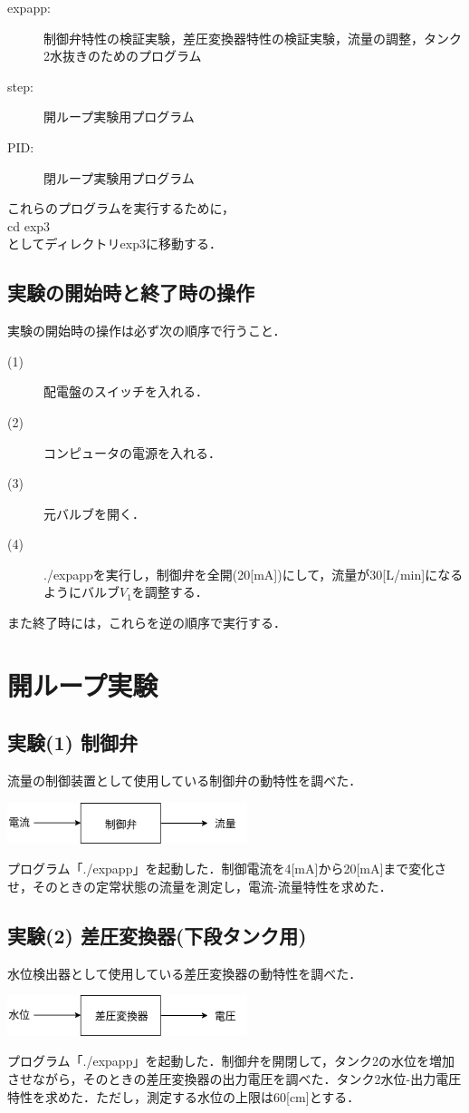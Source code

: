 \documentclass[12pt]{jsarticle}
\begin{document}
\begin{description}
  \item[expapp:]制御弁特性の検証実験，差圧変換器特性の検証実験，流量の調整，タンク2水抜きのためのプログラム
  \item[step:]開ループ実験用プログラム
  \item[PID:]閉ループ実験用プログラム
\end{description}

これらのプログラムを実行するために，\\
cd exp3\\
としてディレクトリexp3に移動する．
\subsection{実験の開始時と終了時の操作}
実験の開始時の操作は必ず次の順序で行うこと．

\begin{description}
  \item[(1)] 配電盤のスイッチを入れる．
  \item[(2)] コンピュータの電源を入れる．
  \item[(3)] 元バルブを開く．
  \item[(4)] ./expappを実行し，制御弁を全開(20[mA])にして，流量が30[L/min]になるようにバルブ$V_1$を調整する．
\end{description}

また終了時には，これらを逆の順序で実行する．

\section{開ループ実験}
\subsection{実験(1) 制御弁}
流量の制御装置として使用している制御弁の動特性を調べた．
\begin{center}
  \includegraphics[clip,width=7.0cm]{../img/A_Q_transform.png}
\end{center}
プログラム「./expapp」を起動した．制御電流を4[mA]から20[mA]まで変化させ，そのときの定常状態の流量を測定し，電流-流量特性を求めた．
\subsection{実験(2) 差圧変換器(下段タンク用)}
水位検出器として使用している差圧変換器の動特性を調べた．
\begin{center}
  \includegraphics[clip,width=7.0cm]{../img/H_V_transform.png}
\end{center}
プログラム「./expapp」を起動した．制御弁を開閉して，タンク2の水位を増加させながら，そのときの差圧変換器の出力電圧を調べた．タンク2水位-出力電圧特性を求めた．ただし，測定する水位の上限は60[cm]とする．
\end{document}
